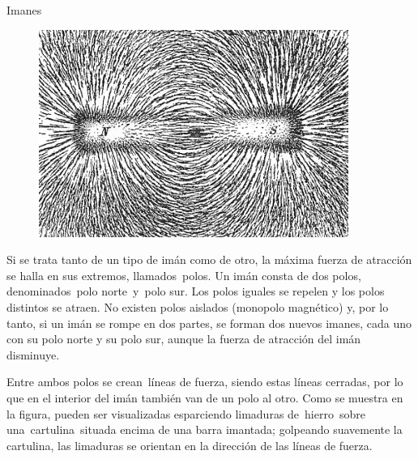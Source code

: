 \begin{myblock}{Imanes}
\begin{figure}[H]
	\centering
	\includegraphics[width=0.9\textwidth]{imagenes/imagenes27/T27IM11.png}
\end{figure}

\vspace{2mm} Si se trata tanto de un tipo de imán como de otro, la máxima fuerza de atracción se halla en sus extremos, llamados polos. Un imán consta de dos polos, denominados polo norte y polo sur. Los polos iguales se repelen y los polos distintos se atraen. No existen polos aislados (monopolo magnético) y, por lo tanto, si un imán se rompe en dos partes, se forman dos nuevos imanes, cada uno con su polo norte y su polo sur, aunque la fuerza de atracción del imán disminuye.

\vspace{2mm} Entre ambos polos se crean líneas de fuerza, siendo estas líneas cerradas, por lo que en el interior del imán también van de un polo al otro. Como se muestra en la figura, pueden ser visualizadas esparciendo limaduras de hierro sobre una cartulina situada encima de una barra imantada; golpeando suavemente la cartulina, las limaduras se orientan en la dirección de las líneas de fuerza.

\end{myblock}

